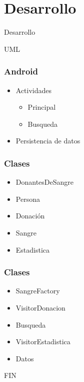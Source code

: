 \documentclass{beamer}
\begin{document}
	\section{Desarrollo}
		\begin{frame}
			\Huge Desarrollo
		\end{frame}
		\begin{frame}
			\Huge UML
		\end{frame}
		\begin{frame}
			\frametitle{Android}
			\begin{itemize}
				\item Actividades
					\begin{itemize}
						\item Principal
						\item Busqueda
					\end{itemize}
				\item Persistencia de datos
			\end{itemize}
		\end{frame}
		\begin{frame}
			\frametitle{Clases}
			\begin{itemize}
				\item DonantesDeSangre
				\item Persona
				\item Donaci\'on
				\item Sangre
				\item Estadistica
			\end{itemize}
		\end{frame}
		\begin{frame}
			\frametitle{Clases}
			\begin{itemize}
				\item SangreFactory
				\item VisitorDonacion
				\item Busqueda
				\item VisitorEstadistica
				\item Datos
			\end{itemize}
		\end{frame}

		\begin{frame}
			\Huge FIN
		\end{frame}
\end{document}

